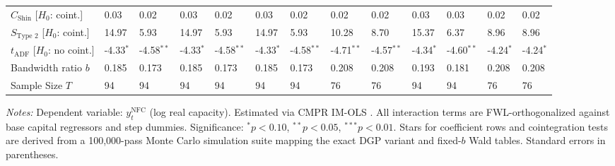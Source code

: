 \begin{table}[h!]
\begin{tabular}{p{3.2cm}p{1.0cm}p{1.0cm}p{1.0cm}p{1.0cm}p{1.0cm}p{1.0cm}p{1.0cm}p{1.0cm}p{1.0cm}p{1.0cm}p{1.0cm}p{1.0cm}}
$C_{\text{Shin}}$ [$H_0$: coint.] & 0.03 & 0.02 & 0.03 & 0.02 & 0.03 & 0.02 & 0.02 & 0.02 & 0.03 & 0.03 & 0.02 & 0.02 \\
$S_{\text{Type 2}}$ [$H_0$: coint.] & 14.97 & 5.93 & 14.97 & 5.93 & 14.97 & 5.93 & 10.28 & 8.70 & 15.37 & 6.37 & 8.96 & 8.96 \\
$t_{\text{ADF}}$ [$H_0$: no coint.] & -4.33$^{*}$ & -4.58$^{**}$ & -4.33$^{*}$ & -4.58$^{**}$ & -4.33$^{*}$ & -4.58$^{**}$ & -4.71$^{**}$ & -4.57$^{**}$ & -4.34$^{*}$ & -4.60$^{**}$ & -4.24$^{*}$ & -4.24$^{*}$ \\
Bandwidth ratio $b$ & 0.185 & 0.173 & 0.185 & 0.173 & 0.185 & 0.173 & 0.208 & 0.208 & 0.193 & 0.181 & 0.208 & 0.208 \\
Sample Size $T$ & 94 & 94 & 94 & 94 & 94 & 94 & 76 & 76 & 94 & 94 & 76 & 76 \\
\bottomrule
\end{tabular}
\begin{minipage}{\textwidth}
\scriptsize
\textit{Notes:} Dependent variable: $y_t^{\text{NFC}}$ (log real capacity). Estimated via CMPR IM-OLS \citep{VogelsangWagner2024}. All interaction terms are FWL-orthogonalized against base capital regressors and step dummies. Significance: $^*p<0.10$, $^{**}p<0.05$, $^{***}p<0.01$. Stars for coefficient rows and cointegration tests are derived from a 100,000-pass Monte Carlo simulation suite mapping the exact DGP variant and fixed-$b$ Wald tables. Standard errors in parentheses.
\end{minipage}
\end{table}


